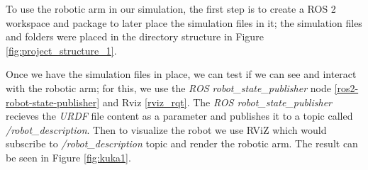 \documentclass[12pt,oneside]{article}
\begin{document}
To use the robotic arm in our simulation, the first step is to create a ROS 2 workspace and package to later place the simulation files in it; the simulation files and folders were placed in the directory structure in Figure \ref{fig:project_structure_1}.

Once we have the simulation files in place, we can test if we can see and interact with the robotic arm; for this, we use the \textit{ROS robot\_state\_publisher} node \ref{ros2-robot-state-publisher} and Rviz \ref{rviz_rqt}. The \textit{ROS robot\_state\_publisher} recieves the \textit{URDF} file content as a parameter and publishes it to a topic called \textit{/robot\_description}. Then to visualize the robot we use RViZ which would subscribe to \textit{/robot\_description} topic and render the robotic arm. The result can be seen in Figure \ref{fig:kuka1}.
\end{document}
